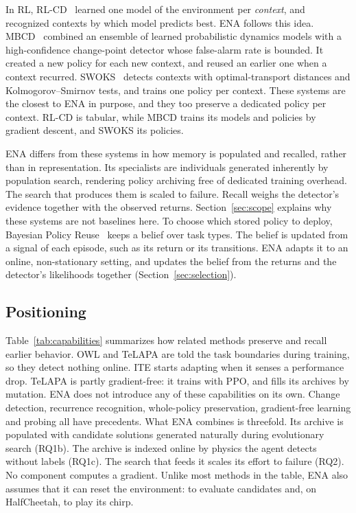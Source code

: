 In RL, RL-CD~\cite{dasilva2006dealing} learned one model of the environment per \textit{context}, and recognized contexts by which model predicts best. ENA follows this idea. MBCD~\cite{alegre2021minimum} combined an ensemble of learned probabilistic dynamics models with a high-confidence change-point detector whose false-alarm rate is bounded. It created a new policy for each new context, and reused an earlier one when a context recurred. SWOKS~\cite{dick2024statistical} detects contexts with optimal-transport distances and Kolmogorov--Smirnov tests, and trains one policy per context. These systems are the closest to ENA in purpose, and they too preserve a dedicated policy per context. RL-CD is tabular, while MBCD trains its models and policies by gradient descent, and SWOKS its policies.

ENA differs from these systems in how memory is populated and recalled, rather than in representation. Its specialists are individuals generated inherently by population search, rendering policy archiving free of dedicated training overhead. The search that produces them is scaled to failure. Recall weighs the detector's evidence together with the observed returns. Section~\ref{sec:scope} explains why these systems are not baselines here. To choose which stored policy to deploy, Bayesian Policy Reuse~\cite{rosman2016bayesian} keeps a belief over task types. The belief is updated from a signal of each episode, such as its return or its transitions. ENA adapts it to an online, non-stationary setting, and updates the belief from the returns and the detector's likelihoods together (Section~\ref{sec:selection}).

\subsection{Positioning}
Table~\ref{tab:capabilities} summarizes how related methods preserve and recall earlier behavior. OWL and TeLAPA are told the task boundaries during training, so they detect nothing online. ITE starts adapting when it senses a performance drop. TeLAPA is partly gradient-free: it trains with PPO, and fills its archives by mutation. ENA does not introduce any of these capabilities on its own. Change detection, recurrence recognition, whole-policy preservation, gradient-free learning and probing all have precedents. What ENA combines is threefold. Its archive is populated with candidate solutions generated naturally during evolutionary search (RQ1b). The archive is indexed online by physics the agent detects without labels (RQ1c). The search that feeds it scales its effort to failure (RQ2). No component computes a gradient. Unlike most methods in the table, ENA also assumes that it can reset the environment: to evaluate candidates and, on HalfCheetah, to play its chirp.

